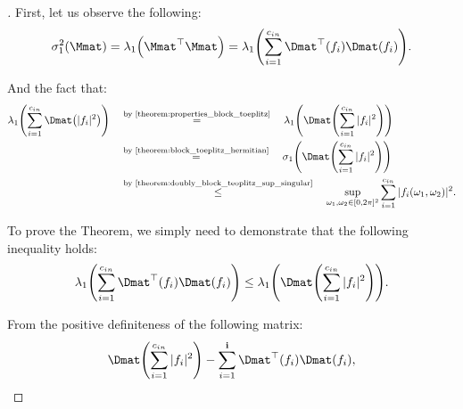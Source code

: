 \begingroup
\addtolength{\jot}{1.5em}

\begin{proof}[]
First, let us observe the following:
\begin{equation}
    \sigma_1^2 \left( \Mmat \right) = \lambda_1 \left( \Mmat^{\top} \Mmat \right) = \lambda_1 \left( \sum_{i=1}^{\cin} \Dmat^{\top} \left(f_i \right) \Dmat (f_i) \right).
\end{equation}

And the fact that:
\begin{align}
    \lambda_1 \left( \sum_{i=1}^{\cin} \Dmat \left(|f_i|^2 \right) \right) \quad &\stackrel{\text{by \Cref{theorem:properties_block_toeplitz}}}{=} \quad \lambda_1 \left( \Dmat \left( \sum_{i=1}^{\cin} |f_i|^2 \right) \right) \\ 
    \quad &\stackrel{\text{by \Cref{theorem:block_toeplitz_hermitian}}}{=} \quad \sigma_1 \left( \Dmat \left( \sum_{i=1}^{\cin} |f_i|^2 \right) \right) \\
    \quad &\stackrel{\text{by \Cref{theorem:doubly_block_teoplitz_sup_singular}}}{\leq} \quad \sup_{\omega_1, \omega_2 \in [0, 2\pi]^2} \sum_{i=1}^{\cin} |f_i(\omega_1, \omega_2)|^2.
\end{align}

\noindent
To prove the Theorem, we simply need to demonstrate that the following inequality holds:
\begin{equation} \label{equation:eq2}
    \lambda_1 \left( \sum_{i=1}^{\cin} \Dmat^{\top} \left(f_i \right) \Dmat (f_i) \right) \leq \lambda_1 \left( \Dmat \left( \sum_{i=1}^{\cin} |f_i|^2 \right) \right). 
\end{equation}

\noindent
From the positive definiteness of the following matrix:
\begin{equation}
    \Dmat \left( \sum_{i=1}^{\cin} |f_i|^2 \right) - \sum_{i=1}^{\ci} \Dmat^{\top} \left(f_i \right) \Dmat (f_i),
\end{equation}


\end{proof}
